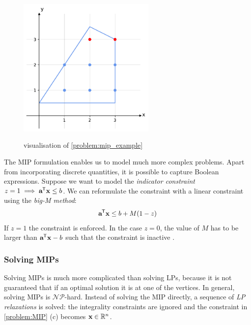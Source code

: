 \begin{figure}[h!]
    \caption{visualisation of \cref{problem:mip_example}}
    \centering
    \includegraphics[width=0.6\textwidth]{Images/mip.pdf}
    \label{fig:mip}
\end{figure}

The MIP formulation enables us to model much more complex problems. Apart from incorporating discrete quantities, it is possible to capture Boolean expressions. Suppose we want to model the \textit{indicator constraint} $z = 1 \implies \bold a ^{\mkern-1.5mu\mathsf{T}} \bold x \leq b$. We can reformulate the constraint with a linear constraint using the \textit{big-M method}: 
\begin{equation*}
    \bold a ^{\mkern-1.5mu\mathsf{T}} \bold x \leq b + M(1-z)
\end{equation*}
If $z=1$ the constraint is enforced. In the case $z=0$, the value of $M$ has to be larger than $\bold a ^{\mkern-1.5mu\mathsf{T}} \bold x - b$ such that the constraint is inactive \cite{aps_mosek_nodate}.

\subsubsection{Solving MIPs}
Solving MIPs is much more complicated than solving LPs, because it is not guaranteed that if an optimal solution it is at one of the vertices. In general, solving MIPs is $\mathcal{NP}$-hard.  Instead of solving the MIP directly, a sequence of \textit{LP relaxations} is solved: the integrality constraints are ignored and the constraint in \cref{problem:MIP} (c) becomes $\bold x \in \mathbb{R}^n$.

